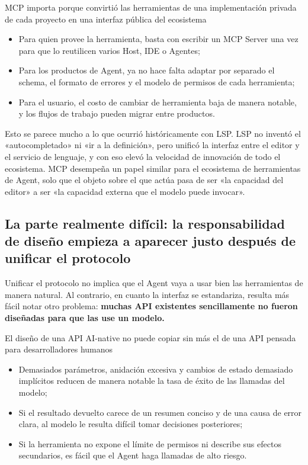 \documentclass[a4paper]{article}
\begin{document}
\begin{importantbox}{MCP importa porque convirtió las herramientas de una implementación privada de cada proyecto en una interfaz pública del ecosistema}
\begin{itemize}
    \item Para quien provee la herramienta, basta con escribir un MCP Server una vez para que lo reutilicen varios Host, IDE o Agentes;
    \item Para los productos de Agent, ya no hace falta adaptar por separado el schema, el formato de errores y el modelo de permisos de cada herramienta;
    \item Para el usuario, el costo de cambiar de herramienta baja de manera notable, y los flujos de trabajo pueden migrar entre productos.
\end{itemize}
\end{importantbox}

Esto se parece mucho a lo que ocurrió históricamente con LSP. LSP no inventó el «autocompletado» ni «ir a la definición», pero unificó la interfaz entre el editor y el servicio de lenguaje, y con eso elevó la velocidad de innovación de todo el ecosistema. MCP desempeña un papel similar para el ecosistema de herramientas de Agent, solo que el objeto sobre el que actúa pasa de ser «la capacidad del editor» a ser «la capacidad externa que el modelo puede invocar».

\subsection{La parte realmente difícil: la responsabilidad de diseño empieza a aparecer justo después de unificar el protocolo}
Unificar el protocolo no implica que el Agent vaya a usar bien las herramientas de manera natural. Al contrario, en cuanto la interfaz se estandariza, resulta más fácil notar otro problema: \textbf{muchas API existentes sencillamente no fueron diseñadas para que las use un modelo.}

\begin{warningbox}{El diseño de una API AI-native no puede copiar sin más el de una API pensada para desarrolladores humanos}
\begin{itemize}
    \item Demasiados parámetros, anidación excesiva y cambios de estado demasiado implícitos reducen de manera notable la tasa de éxito de las llamadas del modelo;
    \item Si el resultado devuelto carece de un resumen conciso y de una causa de error clara, al modelo le resulta difícil tomar decisiones posteriores;
    \item Si la herramienta no expone el límite de permisos ni describe sus efectos secundarios, es fácil que el Agent haga llamadas de alto riesgo.
\end{itemize}
\end{warningbox}
\end{document}
